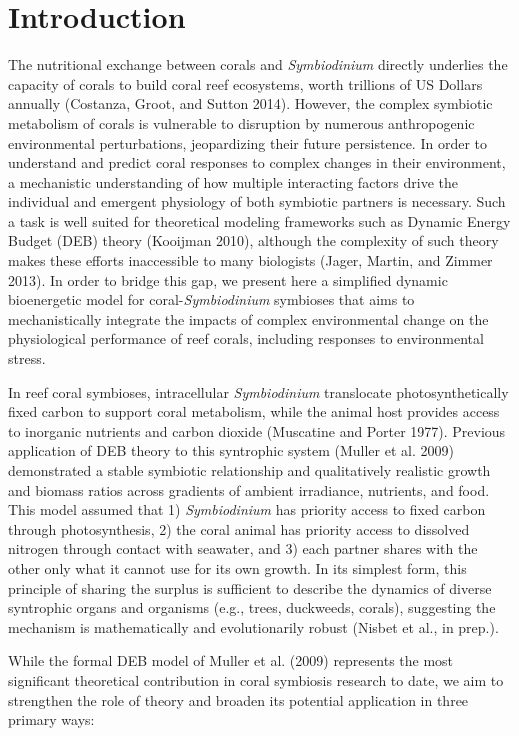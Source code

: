 \documentclass[]{elsarticle} %
\begin{document}
\section{Introduction}\label{introduction}

The nutritional exchange between corals and \emph{Symbiodinium} directly
underlies the capacity of corals to build coral reef ecosystems, worth
trillions of US Dollars annually (Costanza, Groot, and Sutton 2014).
However, the complex symbiotic metabolism of corals is vulnerable to
disruption by numerous anthropogenic environmental perturbations,
jeopardizing their future persistence. In order to understand and
predict coral responses to complex changes in their environment, a
mechanistic understanding of how multiple interacting factors drive the
individual and emergent physiology of both symbiotic partners is
necessary. Such a task is well suited for theoretical modeling
frameworks such as Dynamic Energy Budget (DEB) theory (Kooijman 2010),
although the complexity of such theory makes these efforts inaccessible
to many biologists (Jager, Martin, and Zimmer 2013). In order to bridge
this gap, we present here a simplified dynamic bioenergetic model for
coral-\emph{Symbiodinium} symbioses that aims to mechanistically
integrate the impacts of complex environmental change on the
physiological performance of reef corals, including responses to
environmental stress.

In reef coral symbioses, intracellular \emph{Symbiodinium} translocate
photosynthetically fixed carbon to support coral metabolism, while the
animal host provides access to inorganic nutrients and carbon dioxide
(Muscatine and Porter 1977). Previous application of DEB theory to this
syntrophic system (Muller et al. 2009) demonstrated a stable symbiotic
relationship and qualitatively realistic growth and biomass ratios
across gradients of ambient irradiance, nutrients, and food. This model
assumed that 1) \emph{Symbiodinium} has priority access to fixed carbon
through photosynthesis, 2) the coral animal has priority access to
dissolved nitrogen through contact with seawater, and 3) each partner
shares with the other only what it cannot use for its own growth. In its
simplest form, this principle of sharing the surplus is sufficient to
describe the dynamics of diverse syntrophic organs and organisms (e.g.,
trees, duckweeds, corals), suggesting the mechanism is mathematically
and evolutionarily robust (Nisbet et al., in prep.).

While the formal DEB model of Muller et al. (2009) represents the most
significant theoretical contribution in coral symbiosis research to
date, we aim to strengthen the role of theory and broaden its potential
application in three primary ways:
\end{document}
